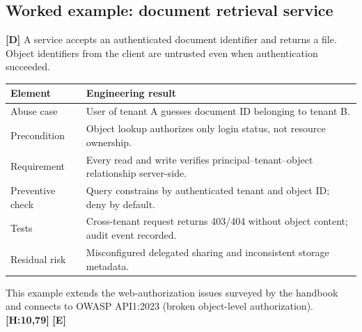 \documentclass[10pt,letterpaper,oneside]{article}
\newcommand{\handbookref}[1]{\textsf{\color{accent}\textbf{[H:#1]}}}
\newcommand{\modernext}{\textsf{\color{muted}\textbf{[E]}}}
\newcommand{\designed}{\textsf{\color{accent}\textbf{[D]}}}
\begin{document}
\subsection{Worked example: document retrieval service}\designed{}
A service accepts an authenticated document identifier and returns a file. Object identifiers from the client are untrusted even when authentication succeeded.
\begin{center}
\end{center}
\par\medskip\noindent\begin{tabularx}{\textwidth}{@{}p{}X@{}}\toprule
Element & Engineering result \\ \midrule
Abuse case & User of tenant A guesses document ID belonging to tenant B.\\
Precondition & Object lookup authorizes only login status, not resource ownership.\\
Requirement & Every read and write verifies principal--tenant--object relationship server-side.\\
Preventive check & Query constrains by authenticated tenant and object ID; deny by default.\\
Tests & Cross-tenant request returns 403/404 without object content; audit event recorded.\\
Residual risk & Misconfigured delegated sharing and inconsistent storage metadata.\\
\bottomrule\end{tabularx}\par\medskip
This example extends the web-authorization issues surveyed by the handbook and connects to OWASP API1:2023 (broken object-level authorization). \handbookref{10,79} \modernext{}
\end{document}
